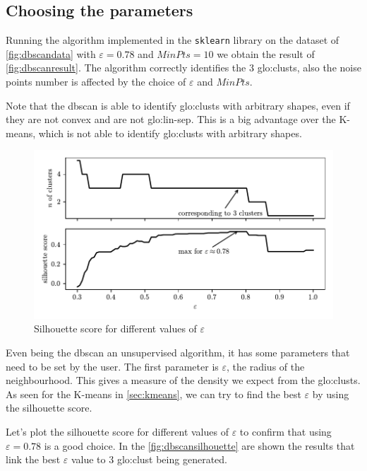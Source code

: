 \subsection{Choosing the parameters}
Running the algorithm implemented in the \texttt{sklearn} library on the dataset of \autoref{fig:dbscandata} with $\varepsilon = 0.78$ and $MinPts = 10$ we obtain the result of \autoref{fig:dbscanresult}. The algorithm correctly identifies the $3$ \gls{glo:clust}s, also the noise points number is affected by the choice of $\varepsilon$ and $MinPts$.

Note that the \gls{dbscan} is able to identify \gls{glo:clust}s with arbitrary shapes, even if they are not convex and are not \gls{glo:lin-sep}. This is a big advantage over the K-means, which is not able to identify \gls{glo:clust}s with arbitrary shapes.


\begin{figure}
    \centering
    \includegraphics{images/DBSCAN/Figure_4.pdf}
    \caption{Silhouette score for different values of $\varepsilon$}
    \label{fig:dbscansilhouette}
\end{figure}

Even being the \gls{dbscan} an unsupervised algorithm, it has some parameters that need to be set by the user.
The first parameter is $\varepsilon$, the radius of the neighbourhood. This gives a measure of the density we expect from the \gls{glo:clust}s. As seen for the K-means in \autoref{sec:kmeans}, we can try to find the best $\varepsilon$ by using the silhouette score.

Let's plot the silhouette score for different values of $\varepsilon$ to confirm that using $\varepsilon = 0.78$ is a good choice. In the \autoref{fig:dbscansilhouette} are shown the results that link the best $\varepsilon$ value to $3$ \gls{glo:clust} being generated.

